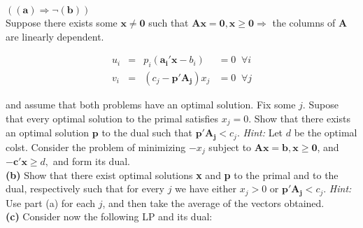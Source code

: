 \documentclass{article}
\begin{document}
\noindent
$(\mathbf{(a) \Rightarrow \neg (b)})$ \\
Suppose there exists some $\mathbf{x \neq 0}$ such that $\mathbf{Ax = 0, x \geq 0} \Rightarrow $  the columns of $\mathbf{A}$ are linearly dependent.

\noindent
\begin{equation*}
\begin{aligned}
u_i & = & p_i (\mathbf{a_i'x} - b_i) & = 0 \; \; \forall i \\
v_i & = & (c_j - \mathbf{p' A_j}) x_j & = 0 \; \; \forall j
\end{aligned}
\end{equation*}


and assume that both problems have an optimal solution.  Fix some $j$.  Supose that every optimal solution to the primal satisfies $x_j = 0$.  Show that there exists an optimal solution $\mathbf{p}$ to the dual such that $\mathbf{p'A_j} < c_j$.  \emph{Hint:} Let $d$ be the optimal colst.  Consider the problem of minimizing $-x_j$ subject to $\mathbf{Ax=b, x\geq 0}$, and $\mathbf{-c'x} \geq d,$ and form its dual.\\

\noindent \textbf{(b)} Show that there exist optimal solutions \textbf{x} and \textbf{p} to the primal and to the dual, respectively such that for every $j$ we have either $x_j > 0$ or $\mathbf{p'A_j} < c_j$.  \emph{Hint:} Use part (a) for each $j$, and then take the average of the vectors obtained. \\

\noindent \textbf{(c)} Consider now the following LP and its dual: \\

\begin{Parallel}[v]{0.5\textwidth}{0.2\textwidth}
\ParallelPar
\end{Parallel}
\end{document}
